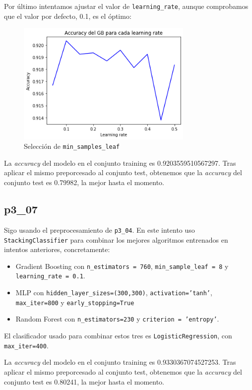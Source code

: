 \documentclass[a4]{article}
\begin{document}
Por último intentamos ajustar el valor de \texttt{learning\_rate}, aunque comprobamos que el valor por defecto, 0.1, es el óptimo:

\begin{figure}[H]
  \centering
  \caption{Selección de \texttt{min\_samples\_leaf}}
  \includegraphics[width=85mm]{imagenes/p3_06_learning_rate}
\end{figure}

La \textit{accuracy} del modelo en el conjunto training es 0.9203559510567297. Tras aplicar el mismo preporcesado al conjunto test, obtenemos que la \textit{accuracy} del conjunto test es 0.79982, la mejor hasta el momento.

\subsection{p3\_07}

Sigo usando el preprocesamiento de \texttt{p3\_04}. En este intento uso \texttt{StackingClassifier} para combinar los mejores algoritmos entrenados en intentos anteriores, concretamente:

\begin{itemize}
\item Gradient Boosting con \texttt{n\_estimators = 760}, \texttt{min\_sample\_leaf = 8} y \texttt{learning\_rate = 0.1}.
\item MLP con \texttt{hidden\_layer\_sizes=(300,300)}, \texttt{activation='tanh'}, \texttt{max\_iter=800} y \texttt{early\_stopping=True}
\item Random Forest con \texttt{n\_estimators=230} y \texttt{criterion = 'entropy'}.
\end{itemize}

El clasificador usado para combinar estos tres es \texttt{LogisticRegression}, con \texttt{max\_iter=400}.

La \textit{accuracy} del modelo en el conjunto training es 0.9330367074527253. Tras aplicar el mismo preporcesado al conjunto test, obtenemos que la \textit{accuracy} del conjunto test es 0.80241, la mejor hasta el momento.
\end{document}
